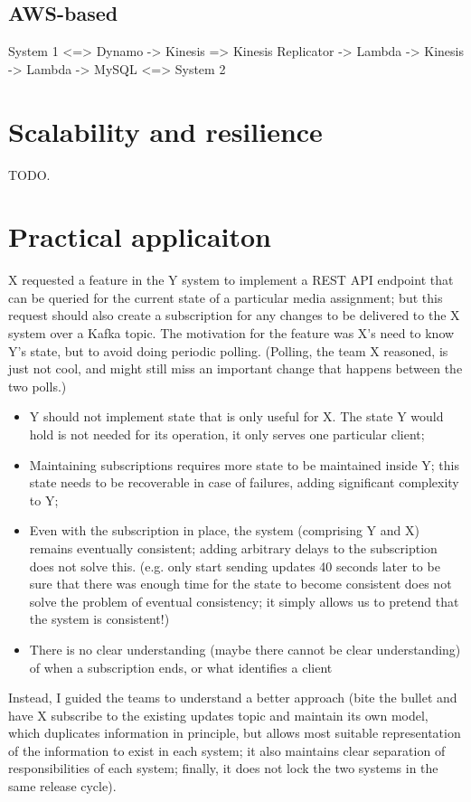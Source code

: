 \subsection{AWS-based}

System 1 <=> Dynamo 
          -> Kinesis => Kinesis Replicator -> Lambda -> Kinesis -> Lambda -> MySQL <=> System 2

\section{Scalability and resilience}
TODO.

\section{Practical applicaiton}
X requested a feature in the Y system to implement a REST API endpoint that can be queried for the current state of a particular media assignment; but this request should also create a subscription for any changes to be delivered to the X system over a Kafka topic. The motivation for the feature was X’s need to know Y’s state, but to avoid doing periodic polling. (Polling, the team X reasoned, is just not cool, and might still miss an important change that happens between the two polls.)
\begin{itemize}
  \item Y should not implement state that is only useful for X. The state Y would hold is not needed for its operation, it only serves one particular client;
  \item Maintaining subscriptions requires more state to be maintained inside Y; this state needs to be recoverable in case of failures, adding significant complexity to Y;
  \item  Even with the subscription in place, the system (comprising Y and X) remains eventually consistent; adding arbitrary delays to the subscription does not solve this. (e.g. only start sending updates 40 seconds later to be sure that there was enough time for the state to become consistent does not solve the problem of eventual consistency; it simply allows us to pretend that the system is consistent!)
  \item There is no clear understanding (maybe there cannot be clear understanding) of when a subscription ends, or what identifies a client
\end{itemize}
Instead, I guided the teams to understand a better approach (bite the bullet and have X subscribe to the existing updates topic and maintain its own model, which duplicates information in principle, but allows most suitable representation of the information to exist in each system; it also maintains clear separation of responsibilities of each system; finally, it does not lock the two systems in the same release cycle).


\printbibliography

